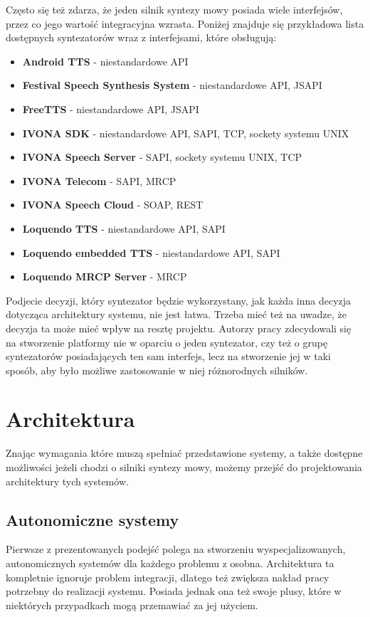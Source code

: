 Często się też zdarza, że jeden silnik syntezy mowy posiada wiele interfejsów, przez co jego wartość integracyjna wzrasta. Poniżej znajduje się przykładowa lista dostępnych syntezatorów wraz z interfejsami, które obsługują:

\begin{itemize}
	\item \textbf{Android TTS} - niestandardowe API
	\item \textbf{Festival Speech Synthesis System} - niestandardowe API, JSAPI
	\item \textbf{FreeTTS} - niestandardowe API, JSAPI
	\item \textbf{IVONA SDK} - niestandardowe API, SAPI, TCP, sockety systemu UNIX
	\item \textbf{IVONA Speech Server}  - SAPI, sockety systemu UNIX, TCP
	\item \textbf{IVONA Telecom} - SAPI, MRCP
	\item \textbf{IVONA Speech Cloud} - SOAP, REST
	\item \textbf{Loquendo TTS} - niestandardowe API, SAPI
	\item \textbf{Loquendo embedded TTS} - niestandardowe API, SAPI
	\item \textbf{Loquendo MRCP Server} - MRCP
\end{itemize}


Podjecie decyzji, który syntezator będzie wykorzystany, jak każda inna decyzja dotycząca architektury systemu, nie jest łatwa. Trzeba mieć też na uwadze, że decyzja ta może mieć wpływ na resztę projektu. Autorzy pracy zdecydowali się na stworzenie platformy nie w oparciu o jeden syntezator, czy też o grupę syntezatorów posiadających ten sam interfejs, lecz na stworzenie jej w taki sposób, aby było możliwe zastosowanie w niej różnorodnych silników. 
\section {Architektura}

Znając wymagania które muszą spełniać przedstawione systemy, a także dostępne możliwości jeżeli chodzi o silniki syntezy mowy,  możemy przejść do projektowania architektury tych systemów.

\subsection {Autonomiczne systemy}
Pierwsze z prezentowanych podejść polega na stworzeniu wyspecjalizowanych, autonomicznych systemów dla każdego problemu z osobna. Architektura ta kompletnie ignoruje problem integracji, dlatego też zwiększa nakład pracy potrzebny do realizacji systemu.  Posiada jednak ona też swoje plusy, które w niektórych przypadkach mogą przemawiać za jej użyciem. 

